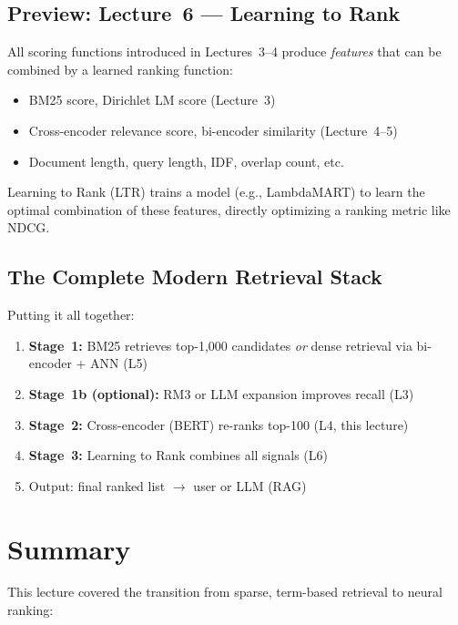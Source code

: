 \documentclass[11pt,a4paper]{article}
\theoremstyle{definition}
\theoremstyle{plain}
\begin{document}
\subsection{Preview: Lecture~6 --- Learning to Rank}

All scoring functions introduced in Lectures~3--4 produce \emph{features} that can be combined by a learned ranking function:
\begin{itemize}
    \item BM25 score, Dirichlet LM score (Lecture~3)
    \item Cross-encoder relevance score, bi-encoder similarity (Lecture~4--5)
    \item Document length, query length, IDF, overlap count, etc.
\end{itemize}

Learning to Rank (LTR) trains a model (e.g., LambdaMART) to learn the optimal combination of these features, directly optimizing a ranking metric like NDCG.

\subsection{The Complete Modern Retrieval Stack}

Putting it all together:
\begin{enumerate}
    \item \textbf{Stage~1:} BM25 retrieves top-1{,}000 candidates \emph{or} dense retrieval via bi-encoder + ANN (L5)
    \item \textbf{Stage~1b (optional):} RM3 or LLM expansion improves recall (L3)
    \item \textbf{Stage~2:} Cross-encoder (BERT) re-ranks top-100 (L4, this lecture)
    \item \textbf{Stage~3:} Learning to Rank combines all signals (L6)
    \item Output: final ranked list $\to$ user or LLM (RAG)
\end{enumerate}


\section{Summary}
\label{sec:summary}

This lecture covered the transition from sparse, term-based retrieval to neural ranking:
\end{document}
